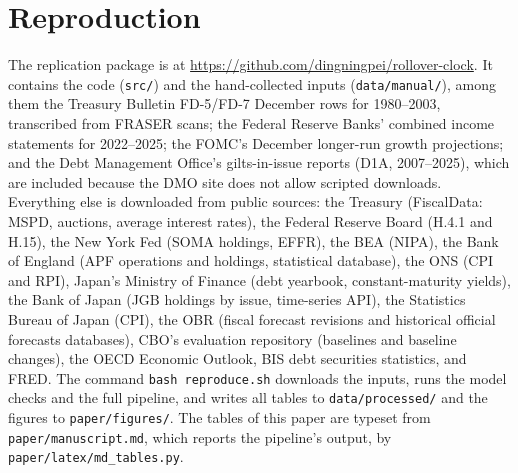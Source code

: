 \section{Reproduction}\label{app:reproduction}

The replication package is at \url{https://github.com/dingningpei/rollover-clock}. It contains the code (\texttt{src/}) and the hand-collected inputs (\texttt{data/manual/}), among them the Treasury Bulletin FD-5/FD-7 December rows for 1980--2003, transcribed from FRASER scans; the Federal Reserve Banks' combined income statements for 2022--2025; the FOMC's December longer-run growth projections; and the Debt Management Office's gilts-in-issue reports (D1A, 2007--2025), which are included because the DMO site does not allow scripted downloads. Everything else is downloaded from public sources: the Treasury (FiscalData: MSPD, auctions, average interest rates), the Federal Reserve Board (H.4.1 and H.15), the New York Fed (SOMA holdings, EFFR), the BEA (NIPA), the Bank of England (APF operations and holdings, statistical database), the ONS (CPI and RPI), Japan's Ministry of Finance (debt yearbook, constant-maturity yields), the Bank of Japan (JGB holdings by issue, time-series API), the Statistics Bureau of Japan (CPI), the OBR (fiscal forecast revisions and historical official forecasts databases), CBO's evaluation repository (baselines and baseline changes), the OECD Economic Outlook, BIS debt securities statistics, and FRED. The command \texttt{bash reproduce.sh} downloads the inputs, runs the model checks and the full pipeline, and writes all tables to \texttt{data/processed/} and the figures to \texttt{paper/figures/}. The tables of this paper are typeset from \texttt{paper/manuscript.md}, which reports the pipeline's output, by \texttt{paper/latex/md\_tables.py}.

